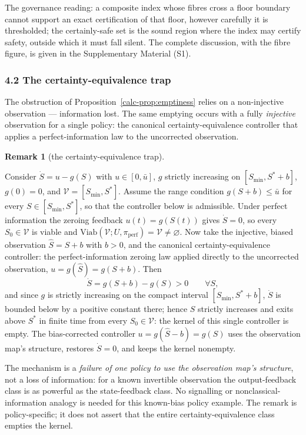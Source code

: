 \documentclass[10pt,twocolumn]{article}
\theoremstyle{definition}
\newtheorem{remark}{Remark}
\begin{document}
The governance reading: a composite index whose fibres cross a floor boundary cannot support an exact certification of that floor, however carefully it is thresholded; the certainly-safe set is the sound region where the index may certify safety, outside which it must fall silent. The complete discussion, with the fibre figure, is given in the Supplementary Material (S1).

\subsubsection{4.2 The certainty-equivalence
trap}\label{calc-the-certainty-equivalence-trap}

The obstruction of Proposition~\ref{calc-prop:emptiness} relies on a non-injective observation ---
information lost. The same emptying occurs with a fully
\emph{injective} observation for a single policy: the canonical
certainty-equivalence controller that applies a perfect-information law
to the uncorrected observation.

\begin{remark}[the certainty-equivalence trap]\label{calc-rem:ce-trap}

Consider \(\dot S = u - g(S)\) with \(u \in [0, \bar u]\), \(g\) strictly
increasing on \([S_{\min}, S^* + b]\), \(g(0) = 0\), and
\(\mathcal{V} = [S_{\min}, S^*]\). Assume the range condition
\(g(S + b) \le \bar u\) for every \(S \in [S_{\min}, S^*]\), so that the
controller below is admissible. Under perfect information the zeroing
feedback \(u(t) = g(S(t))\) gives \(\dot S = 0\), so every
\(S_0 \in \mathcal{V}\) is viable and
\(\mathrm{Viab}(\mathcal{V}; U, \pi_{\mathrm{perf}}) = \mathcal{V} \neq \varnothing\).
Now take the injective, biased observation \(\hat S = S + b\) with
\(b > 0\), and the canonical certainty-equivalence controller: the
perfect-information zeroing law applied directly to the uncorrected
observation, \(u = g(\hat S) = g(S + b)\). Then
\[\dot S = g(S + b) - g(S) > 0 \qquad \forall S,\]
and since \(g\) is strictly increasing on the compact interval
\([S_{\min}, S^* + b]\), \(\dot S\) is bounded below by a positive
constant there; hence \(S\) strictly increases and exits above \(S^*\) in
finite time from every \(S_0 \in \mathcal{V}\): the kernel of this single
controller is empty. The bias-corrected controller
\(u = g(\hat S - b) = g(S)\) uses the observation map's structure, restores
\(\dot S = 0\), and keeps the kernel nonempty.

The mechanism is a \emph{failure of one policy to use the observation
map's structure}, not a loss of information: for a known invertible
observation the output-feedback class is as powerful as the
state-feedback class. No signalling or nonclassical-information analogy is needed for this known-bias policy example. The remark is
policy-specific; it does not assert that the entire certainty-equivalence
class empties the kernel.

\end{remark}
\end{document}
